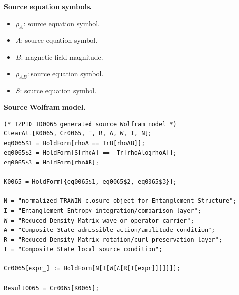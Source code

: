 \begin{minipage}[t]{0.49\linewidth}
\begingroup
\small
\raggedright
\textbf{Source equation symbols.}\par
\begin{itemize}[leftmargin=1.35em,itemsep=1pt,topsep=1pt,parsep=0pt]
    \item $\rho_{A}$: source equation symbol.
    \item $A$: source equation symbol.
    \item $B$: magnetic field magnitude.
    \item $\rho_{AB}$: source equation symbol.
    \item $S$: source equation symbol.
\end{itemize}
\endgroup
\end{minipage}\hfill
\begin{minipage}[t]{0.47\linewidth}
\begingroup
\scriptsize
\raggedright
\textbf{Source Wolfram model.}\par
\begin{Verbatim}[fontsize=\tiny,breaklines=true,breakanywhere=true]
(* TZPID ID0065 generated source Wolfram model *)
ClearAll[K0065, Cr0065, T, R, A, W, I, N];
eq0065$1 = HoldForm[rhoA == TrB[rhoAB]];
eq0065$2 = HoldForm[S[rhoA] == -Tr[rhoAlogrhoA]];
eq0065$3 = HoldForm[rhoAB];

K0065 = HoldForm[{eq0065$1, eq0065$2, eq0065$3}];

N = "normalized TRAWIN closure object for Entanglement Structure";
I = "Entanglement Entropy integration/comparison layer";
W = "Reduced Density Matrix wave or operator carrier";
A = "Composite State admissible action/amplitude condition";
R = "Reduced Density Matrix rotation/curl preservation layer";
T = "Composite State local source condition";

Cr0065[expr_] := HoldForm[N[I[W[A[R[T[expr]]]]]]];

Result0065 = Cr0065[K0065];
\end{Verbatim}
\endgroup
\end{minipage}

